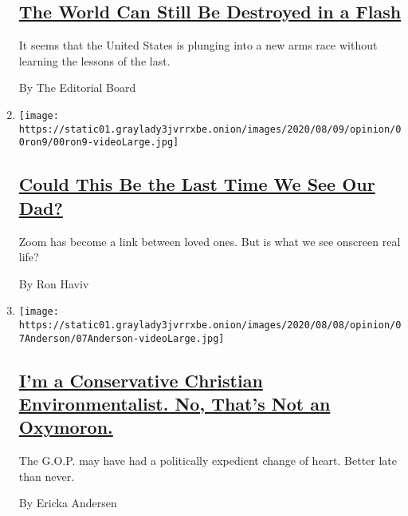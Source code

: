 \begin{enumerate}
  \hypertarget{the-world-can-still-be-destroyed-in-a-flash}{%
  \subsection{\texorpdfstring{\href{/2020/08/06/opinion/hiroshima-anniversary-nuclear-weapons.html}{The
  World Can Still Be Destroyed in a
  Flash}}{The World Can Still Be Destroyed in a Flash}}\label{the-world-can-still-be-destroyed-in-a-flash}}

  It seems that the United States is plunging into a new arms race
  without learning the lessons of the last.

  By The Editorial Board
\item
  \texttt{[image: https://static01.graylady3jvrrxbe.onion/images/2020/08/09/opinion/00ron9/00ron9-videoLarge.jpg]}

  \hypertarget{could-this-be-the-last-time-we-see-our-dad}{%
  \subsection{\texorpdfstring{\href{/2020/08/06/opinion/coronavirus-baruch-haviv-death.html}{Could
  This Be the Last Time We See Our
  Dad?}}{Could This Be the Last Time We See Our Dad?}}\label{could-this-be-the-last-time-we-see-our-dad}}

  Zoom has become a link between loved ones. But is what we see onscreen
  real life?

  By Ron Haviv
\item
  \texttt{[image: https://static01.graylady3jvrrxbe.onion/images/2020/08/08/opinion/07Anderson/07Anderson-videoLarge.jpg]}

  \hypertarget{im-a-conservative-christian-environmentalist-no-thats-not-an-oxymoron}{%
  \subsection{\texorpdfstring{\href{/2020/08/07/opinion/republicans-climate-change.html}{I'm
  a Conservative Christian Environmentalist. No, That's Not an
  Oxymoron.}}{I'm a Conservative Christian Environmentalist. No, That's Not an Oxymoron.}}\label{im-a-conservative-christian-environmentalist-no-thats-not-an-oxymoron}}

  The G.O.P. may have had a politically expedient change of heart.
  Better late than never.

  By Ericka Andersen
\end{enumerate}

